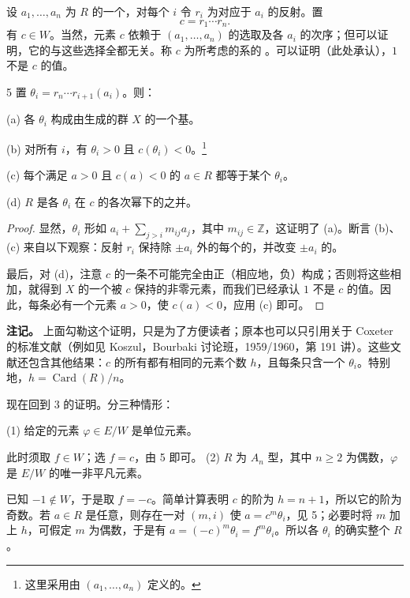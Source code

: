 设 $a_1,\ldots,a_n$ 为 $R$ 的一个，对每个 $i$ 令 $r_i$ 为对应于 $a_i$ 的反射。置
\[c=r_1\cdots r_n.\]
有 $c\in W$。当然，元素 $c$ 依赖于 $(a_1,\ldots,a_n)$ 的选取及各 $a_i$ 的次序；但可以证明，它的与这些选择全都无关。称 $c$ 为所考虑的系的 。可以证明（此处承认），$1$ 不是 $c$ 的值。
\begin{SGAresult}{}{5}
置 $\theta_i=r_n\cdots r_{i+1}(a_i)$。则：

(a) 各 $\theta_i$ 构成由生成的群 $X$ 的一个基。

(b) 对所有 $i$，有 $\theta_i>0$ 且 $c(\theta_i)<0$。\footnote{这里采用由 $(a_1,\ldots,a_n)$ 定义的。}

(c) 每个满足 $a>0$ 且 $c(a)<0$ 的 $a\in R$ 都等于某个 $\theta_i$。

(d) $R$ 是各 $\theta_i$ 在 $c$ 的各次幂下的之并。
\end{SGAresult}
\begin{proof}
显然，$\theta_i$ 形如 $a_i+\sum_{j>i}m_{ij}a_j$，其中 $m_{ij}\in\mathbb Z$，这证明了 (a)。断言 (b)、(c) 来自以下观察：反射 $r_i$ 保持除 $\pm a_i$ 外的每个的，并改变 $\pm a_i$ 的。

最后，对 (d)，注意 $c$ 的一条不可能完全由正（相应地，负）构成；否则将这些相加，就得到 $X$ 的一个被 $c$ 保持的非零元素，而我们已经承认 $1$ 不是 $c$ 的值。因此，每条必有一个元素 $a>0$，使 $c(a)<0$，应用 (c) 即可。
\end{proof}
\textbf{注记。} 上面勾勒这个证明，只是为了方便读者；原本也可以只引用关于 Coxeter 的标准文献（例如见 Koszul，Bourbaki 讨论班，1959/1960，第 191 讲）。这些文献还包含其他结果：$c$ 的所有都有相同的元素个数 $h$，且每条只含一个 $\theta_i$。特别地，$h=\operatorname{Card}(R)/n$。

现在回到 3 的证明。分三种情形：

(1) 给定的元素 $\varphi\in E/W$ 是单位元素。

此时须取 $f\in W$；选 $f=c$，由 5 即可。
(2)  $R$ 为 $A_n$ 型，其中 $n\geq2$ 为偶数，$\varphi$ 是 $E/W$ 的唯一非平凡元素。

已知 $-1\notin W$，于是取 $f=-c$。简单计算表明 $c$ 的阶为 $h=n+1$，所以它的阶为奇数。若 $a\in R$ 是任意，则存在一对 $(m,i)$ 使 $a=c^m\theta_i$，见 5；必要时将 $m$ 加上 $h$，可假定 $m$ 为偶数，于是有 $a=(-c)^m\theta_i=f^m\theta_i$。所以各 $\theta_i$ 的确实整个 $R$。

